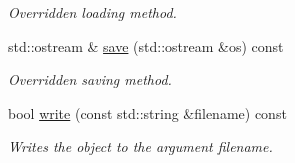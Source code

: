 \begin{DoxyCompactItemize}
\begin{DoxyCompactList}\small\item\em Overridden loading method. \end{DoxyCompactList}\item 
\hypertarget{a00210_a544789ebcd8e55b4d3e28cd94dd34609}{std\-::ostream \& \hyperlink{a00210_a544789ebcd8e55b4d3e28cd94dd34609}{save} (std\-::ostream \&os) const }\label{a00210_a544789ebcd8e55b4d3e28cd94dd34609}

\begin{DoxyCompactList}\small\item\em Overridden saving method. \end{DoxyCompactList}\item 
\hypertarget{a00210_aeb2d89e80de9904cb93144677c200432}{bool \hyperlink{a00210_aeb2d89e80de9904cb93144677c200432}{write} (const std\-::string \&filename) const }\label{a00210_aeb2d89e80de9904cb93144677c200432}

\begin{DoxyCompactList}\small\item\em Writes the object to the argument filename. \end{DoxyCompactList}\end{DoxyCompactItemize}
